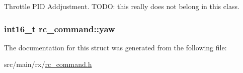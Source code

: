 Throttle P\+I\+D Addjustment. T\+O\+D\+O\+: this really does not belong in this class. 

\hypertarget{structrc__command_a6992103b0952de7cfc5a7dd16ff57f6f}{
\subsubsection[{yaw}]{\setlength{\rightskip}{0pt plus 5cm}int16\+\_\+t rc\+\_\+command\+::yaw}}\label{structrc__command_a6992103b0952de7cfc5a7dd16ff57f6f}


The documentation for this struct was generated from the following file\+:\begin{DoxyCompactItemize}
\item 
src/main/rx/\hyperlink{rc__command_8h}{rc\+\_\+command.\+h}\end{DoxyCompactItemize}
